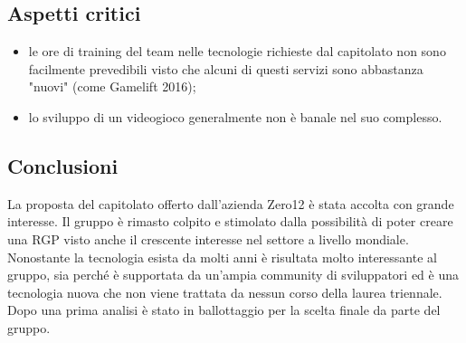 \subsection{Aspetti critici}
\begin{itemize}
\item le ore di training del team nelle tecnologie richieste dal capitolato non sono facilmente prevedibili visto che alcuni di questi servizi sono abbastanza "nuovi" (come Gamelift 2016);
\item lo sviluppo di un videogioco generalmente non è banale nel suo complesso.
\end{itemize}
\subsection{Conclusioni}
La proposta del capitolato offerto dall'azienda Zero12 è stata accolta con grande interesse. Il gruppo è rimasto colpito e stimolato dalla possibilità 
di poter creare una RGP visto anche il crescente interesse nel settore a livello mondiale. Nonostante la tecnologia  esista da molti anni è risultata molto
interessante al gruppo, sia perché è supportata da un'ampia community di sviluppatori ed è una tecnologia nuova che non viene trattata da nessun corso della laurea triennale. Dopo una prima analisi è stato in ballottaggio per la scelta finale da parte del gruppo.

